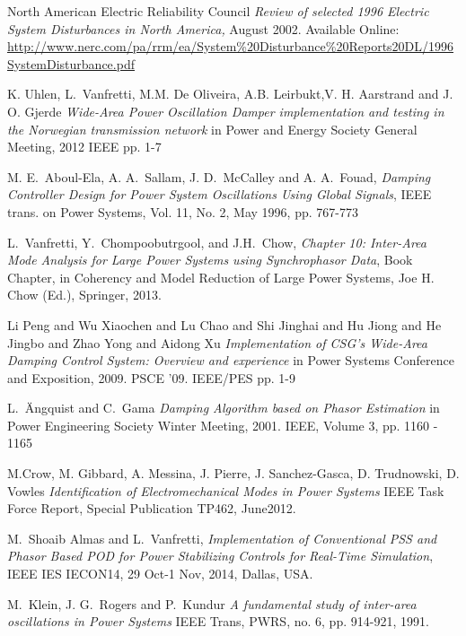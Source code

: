 \documentclass[conference]{IEEEtran}
\begin{document}
\begin{thebibliography}{1}

 North American Electric Reliability Council \emph{Review of selected 1996 Electric System Disturbances in North America,} August 2002. Available Online: \url{http://www.nerc.com/pa/rrm/ea/System\%20Disturbance\%20Reports20DL/1996SystemDisturbance.pdf}

 K. Uhlen, L.~Vanfretti, M.M. De Oliveira, A.B. Leirbukt,V. H. Aarstrand and J. O. Gjerde \emph{Wide-Area Power Oscillation Damper implementation and testing in the Norwegian transmission network} in Power and Energy Society General Meeting, 2012 IEEE pp. 1-7

  M. E.~Aboul-Ela, A. A.~Sallam, J. D.~McCalley and A. A.~Fouad, \emph{Damping Controller Design for Power System Oscillations Using Global Signals}, IEEE trans. on Power Systems, Vol. 11, No. 2, May 1996, pp. 767-773

  L.~Vanfretti, Y.~Chompoobutrgool, and J.H.~Chow, \emph{Chapter 10: Inter-Area Mode Analysis for Large Power Systems using Synchrophasor Data}, Book Chapter, in Coherency and Model Reduction of Large Power Systems, Joe H. Chow (Ed.), Springer, 2013.

 Li Peng and Wu Xiaochen and Lu Chao and Shi Jinghai and Hu Jiong and He Jingbo and Zhao Yong and Aidong Xu \emph{Implementation of CSG's Wide-Area Damping Control System: Overview and experience} in Power Systems Conference and Exposition, 2009. PSCE '09. IEEE/PES pp. 1-9

 L.~\"{A}ngquist and C.~Gama  \emph{Damping Algorithm based on Phasor Estimation} in Power Engineering Society Winter Meeting, 2001. IEEE, Volume 3, pp. 1160 - 1165  

 M.Crow, M. Gibbard, A. Messina, J. Pierre, J. Sanchez-Gasca, D. Trudnowski, D. Vowles \emph{Identification of Electromechanical Modes in Power Systems} IEEE Task Force Report, Special Publication TP462, June2012.

 M.~Shoaib Almas and L.~Vanfretti, \emph{Implementation of Conventional PSS and Phasor Based POD for Power Stabilizing Controls for Real-Time Simulation}, IEEE IES IECON14, 29 Oct-1 Nov, 2014, Dallas, USA.

M.~Klein, J. G.~Rogers and P.~Kundur \emph{A fundamental study of inter-area oscillations in Power Systems} IEEE Trans, PWRS, no. 6, pp. 914-921, 1991.


\end{thebibliography}
\end{document}
